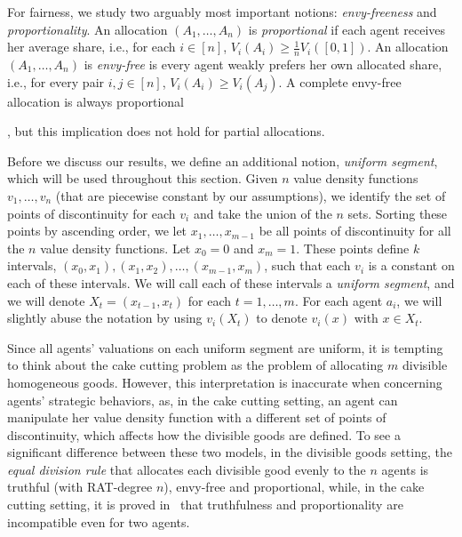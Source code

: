 For fairness, we study two arguably most important notions: \emph{envy-freeness} and \emph{proportionality}.
An allocation $(A_1,\ldots,A_n)$ is \emph{proportional} if each agent receives her average share, i.e., for each $i\in[n]$, $V_i(A_i)\geq\frac1nV_i([0,1])$.
An allocation $(A_1,\ldots,A_n)$ is \emph{envy-free} is every agent weakly prefers her own allocated share, i.e., for every pair $i,j\in[n]$, $V_i(A_i)\geq V_i(A_j)$.
A complete envy-free allocation is always proportional
\iffalse %
: for each $i\in[n]$, summing up the $n$ inequalities $V_i(A_i)\geq V_i(A_j)$ for $j=1,\ldots,n$ yields
$$nV_i(A_i)\geq \sum_{j=1}^nV_i(A_j)=V_i\left(\bigcup_{j=1}^nA_j\right)=V_i([0,1]),$$
which is $V_i(A_i)\geq\frac1nV_i([0,1])$.
However, this implication does not hold for partial allocation: $A_1=\cdots=A_n=\emptyset$ gives an envy-free allocation, but it is clearly not proportional.
\fi
, but this implication does not hold for partial allocations.

Before we discuss our results, we define an additional notion, \emph{uniform segment}, which will be used throughout this section.
Given $n$ value density functions $v_1,\ldots,v_n$ (that are piecewise constant by our assumptions), we identify the set of points of discontinuity for each $v_i$ and take the union of the $n$ sets.
Sorting these points by ascending order, we let $x_1,\ldots,x_{m-1}$ be all points of discontinuity for all the $n$ value density functions.
Let $x_0=0$ and $x_m=1$.
These points define $k$ intervals, $(x_0,x_1),(x_1,x_2),\ldots,(x_{m-1},x_m)$, such that each $v_i$ is a constant on each of these intervals.
We will call each of these intervals a \emph{uniform segment}, and we will denote $X_t=(x_{t-1},x_{t})$ for each $t=1,\ldots,m$.
For each agent $a_i$, we will slightly abuse the notation by using $v_i(X_t)$ to denote $v_i(x)$ with $x\in X_t$.

Since all agents' valuations on each uniform segment are uniform, it is tempting to think about the cake cutting problem as the problem of allocating $m$ divisible homogeneous goods.
However, this interpretation is inaccurate when concerning agents' strategic behaviors, as, in the cake cutting setting, an agent can manipulate her value density function with a different set of points of discontinuity, which affects how the divisible goods are defined.
To see a significant difference between these two models, in the divisible goods setting, the \emph{equal division rule} that allocates each divisible good evenly to the $n$ agents is truthful (with RAT-degree $n$), envy-free and proportional, while, in the cake cutting setting, it is proved in~\citet{tao2022existence} that truthfulness and proportionality are incompatible even for two agents.


